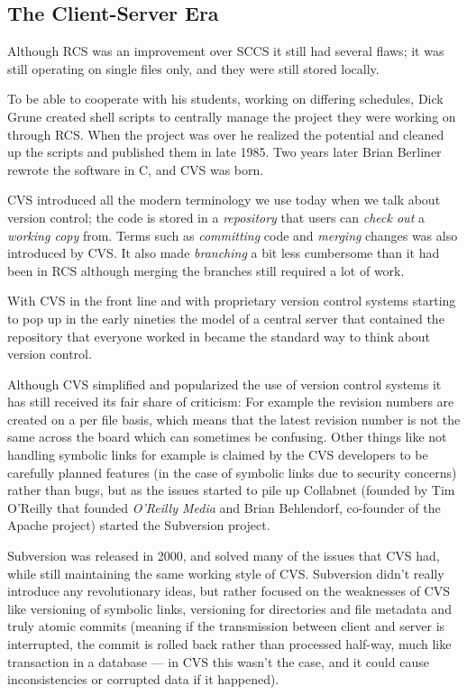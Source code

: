 \documentclass{llncs}
\begin{document}
\subsection{The Client-Server Era}
Although RCS was an improvement over SCCS it still had several flaws;
it was still operating on single files only, and they were still
stored locally. 

To be able to cooperate with his students, working on differing
schedules, Dick Grune created shell scripts to centrally manage the
project they were working on through RCS\cite{grune86}. When the
project was over he realized the potential and cleaned up the scripts
and published them in late 1985. Two years later Brian Berliner
rewrote the software in C, and CVS was born.

CVS introduced all the modern terminology we use today when we talk
about version control\cite{cederqvist93}; the code is stored in a
\emph{repository} that users can \emph{check out} a \emph{working
  copy} from. Terms such as \emph{committing} code and \emph{merging}
changes was also introduced by CVS. It also made \emph{branching} a
bit less cumbersome than it had been in RCS although merging the
branches still required a lot of work.

With CVS in the front line and with proprietary version control
systems starting to pop up in the early nineties the model of a
central server that contained the repository that everyone worked in
became the standard way to think about version control.

Although CVS simplified and popularized the use of version control
systems it has still received its fair share of
criticism\cite{robert06}\cite{subversion}: For example the revision
numbers are created on a per file basis, which means that the latest
revision number is not the same across the board which can sometimes
be confusing. Other things like not handling symbolic links for
example is claimed by the CVS developers to be carefully planned
features (in the case of symbolic links due to security concerns)
rather than bugs, but as the issues started to pile up Collabnet
(founded by Tim O'Reilly that founded \emph{O'Reilly Media} and Brian
Behlendorf, co-founder of the Apache project) started the Subversion
project.

Subversion was released in 2000, and solved many of the issues that
CVS had, while still maintaining the same working style of
CVS. Subversion didn't really introduce any revolutionary ideas, but
rather focused on the weaknesses of CVS like versioning of symbolic
links, versioning for directories and file metadata and truly atomic
commits (meaning if the transmission between client and server is
interrupted, the commit is rolled back rather than processed half-way,
much like transaction in a database\cite{subversion} --- in CVS this
wasn't the case, and it could cause inconsistencies or corrupted data
if it happened).
\end{document}
